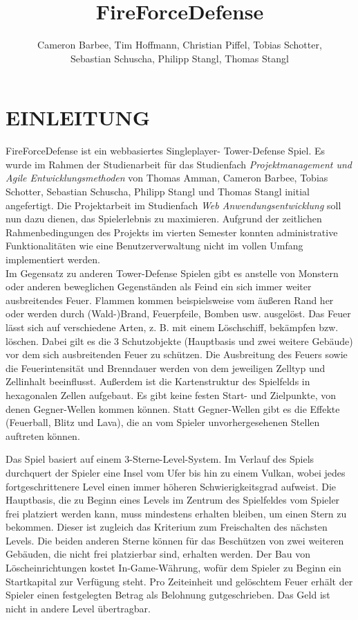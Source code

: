 \documentclass[letterpaper, 10 pt, conference]{ieeeconf}
\title{\LARGE \bf
FireForceDefense
}
\author{Cameron Barbee, Tim Hoffmann,  Christian Piffel,  Tobias Schotter,\\  Sebastian Schuscha,  Philipp Stangl,  Thomas Stangl%
}
\begin{document}
\maketitle
\thispagestyle{empty}
\pagestyle{empty}

\section{EINLEITUNG}

FireForceDefense ist ein webbasiertes Singleplayer- Tower-Defense Spiel.  Es wurde im Rahmen der Studienarbeit für das Studienfach \textit{Projektmanagement und Agile Entwicklungsmethoden} von Thomas Amman, Cameron Barbee,  Tobias Schotter,  Sebastian Schuscha,  Philipp Stangl und Thomas Stangl initial angefertigt.  Die Projektarbeit im Studienfach \textit{Web Anwendungsentwicklung} soll nun dazu dienen,  das Spielerlebnis zu maximieren.  Aufgrund der zeitlichen Rahmenbedingungen des Projekts im vierten Semester konnten administrative Funktionalitäten wie eine Benutzerverwaltung nicht im vollen Umfang implementiert werden.  \\


Im Gegensatz zu anderen Tower-Defense Spielen gibt es anstelle von Monstern oder anderen beweglichen Gegenständen als Feind ein sich immer weiter ausbreitendes Feuer.  Flammen kommen beispielsweise vom äußeren Rand her oder werden durch (Wald-)Brand, Feuerpfeile, Bomben usw. ausgelöst. Das Feuer lässt sich auf verschiedene Arten,  z. B.  mit einem Löschschiff, bekämpfen bzw.  löschen.  Dabei gilt es die 3 Schutzobjekte (Hauptbasis und zwei weitere Gebäude) vor dem sich ausbreitenden Feuer zu schützen.  Die Ausbreitung des Feuers sowie die Feuerintensität und Brenndauer werden von dem jeweiligen Zelltyp und Zellinhalt beeinflusst. 
Außerdem ist die Kartenstruktur des Spielfelds in hexagonalen Zellen aufgebaut.  Es gibt keine festen Start- und Zielpunkte, von denen Gegner-Wellen kommen können.  Statt Gegner-Wellen gibt es die Effekte (Feuerball,  Blitz und Lava), die an vom Spieler unvorhergesehenen Stellen auftreten können.

Das Spiel basiert auf einem 3-Sterne-Level-System.  Im Verlauf des Spiels durchquert der Spieler eine Insel vom Ufer bis hin zu einem Vulkan, wobei jedes fortgeschrittenere Level einen immer höheren Schwierigkeitsgrad aufweist. Die Hauptbasis,  die zu Beginn eines Levels im Zentrum des Spielfeldes vom Spieler frei platziert werden kann, muss mindestens erhalten bleiben, um einen Stern zu bekommen. Dieser ist zugleich das Kriterium zum Freischalten des nächsten Levels.  Die beiden anderen Sterne können für das Beschützen von zwei weiteren Gebäuden, die nicht frei platzierbar sind, erhalten werden.  Der Bau von Löscheinrichtungen kostet \glqq{}In-Game\grqq{}-Währung, wofür dem Spieler zu Beginn ein Startkapital zur Verfügung steht.  Pro Zeiteinheit und gelöschtem Feuer erhält der Spieler einen festgelegten Betrag als Belohnung gutgeschrieben.  Das Geld ist nicht in andere Level übertragbar.\\
\end{document}
